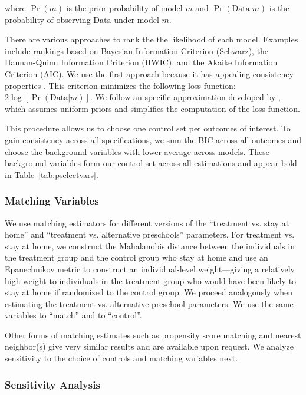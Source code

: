 \noindent where $\Pr(m)$ is the prior probability of model $m$ and $\Pr(\text{Data} | m)$ is the probability of observing $\text{Data}$ under model $m$.

\noindent There are various approaches to rank the the likelihood of each model. Examples include rankings based on Bayesian Information Criterion (Schwarz), the Hannan-Quinn Information Criterion (HWIC), and the Akaike Information Criterion (AIC). We use the first approach because it has appealing consistency properties \citep{Diebold_2007_Forecasting}. This criterion minimizes the following loss function: $2 \log [\Pr( \text{Data} | m)]$. We follow an specific approximation developed by \citet{Claeskens-Hjort_2008_Model-Selection}, which assumes uniform priors and simplifies the computation of the loss function.

\noindent This procedure allows us to choose one control set per outcomes of interest. To gain consistency across all specifications, we sum the BIC across all outcomes and choose the background variables with lower average across models. These background variables form our control set across all estimations and appear bold in Table~\ref{tab:pselectvars}.

\subsubsection{Matching Variables}\label{app:matching-is-fun}

\noindent We use matching estimators for different versions of the ``treatment vs. stay at home'' and ``treatment vs. alternative preschools'' parameters. For treatment vs. stay at home, we construct the Mahalanobis distance between the individuals in the treatment group and the control group who stay at home and use an Epanechnikov metric to construct an individual-level weight---giving a relatively high weight to individuals in the treatment group who would have been likely to stay at home if randomized to the control group. We proceed analogously when estimating the treatment vs. alternative preschool parameters. We use the same variables to ``match'' and to ``control''.

\noindent Other forms of matching estimates such as propensity score matching and nearest neighbor(s) give very similar results and are available upon request. We analyze sensitivity to the choice of controls and matching variables next.

\subsubsection{Sensitivity Analysis} \label{app:senscontrols}

